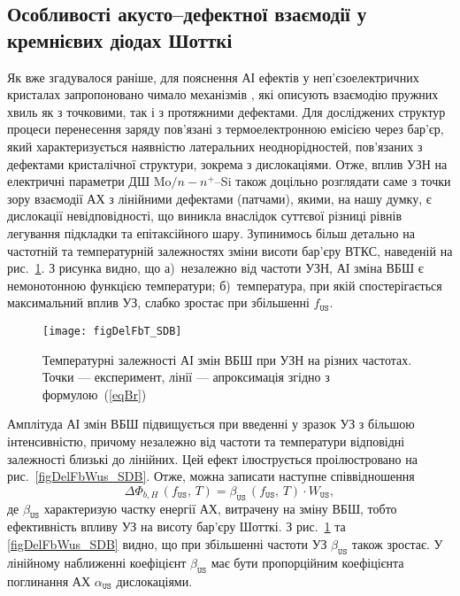 \subsection{Особливості акусто--дефектної взаємодії у кремнієвих діодах Шотткі}

Як вже згадувалося раніше, для пояснення АІ ефектів у неп'єзоелектричних кристалах
запропоновано чимало механізмів \cite{Pavlovich,Korotchenkov1995,MirzadeJAP2011,PELESHCHAK:UPJ2016,Krevchik,MirzadeJAP2005,Davletova2008,OstrovKor92},
які описують взаємодію пружних хвиль як з точковими, так і з протяжними дефектами.
Для досліджених структур процеси перенесення заряду пов'язані з термоелектронною емісією
через бар'єр, який характеризується наявністю латеральних неоднорідностей, пов'язаних з дефектами
кристалічної структури, зокрема з дислокаціями.
Отже, вплив УЗН на електричні параметри ДШ Mo$/n-n^+$--Si також доцільно розглядати саме з точки зору
взаємодії АХ з лінійними дефектами (патчами), якими, на нашу думку, є дислокації невідповідності, що
виникла внаслідок суттєвої різниці рівнів легування підкладки та епітаксійного шару.
Зупинимось більш детально на частотній та температурній залежностях зміни висоти бар'єру ВТКС,
наведеній на рис.~\ref{figDelFbT_SDB}.
З рисунка видно, що
а)~незалежно від частоти УЗН, АІ зміна ВБШ є немонотонною функцією температури;
б)~температура, при якій спостерігається максимальний вплив УЗ, слабко зростає при збільшенні $f_\mathtt{US}$.

\begin{figure}
\center
\texttt{[image: figDelFbT\_SDB]}
\caption{\label{figDelFbT_SDB}
Температурні залежності АІ змін ВБШ при УЗН на різних частотах.
Точки --- експеримент,
лінії --- апроксимація згідно з формулою~(\ref{eqBr})
}%
\end{figure}

Амплітуда АІ змін ВБШ підвищується при введенні у зразок УЗ з більшою інтенсивністю, причому незалежно від частоти та температури
відповідні залежності близькі до лінійних.
Цей ефект ілюструється проілюстровано на рис.~\ref{figDelFbWus_SDB}.
Отже, можна записати наступне співвідношення
\begin{equation}
\label{eqBt}
\Delta\Phi_{b,H}\,(f_\mathtt{US},\,T)=\beta_\mathtt{US}\,(f_\mathtt{US},\,T)\cdot W_\mathtt{US},
\end{equation}
де
$\beta_\mathtt{US}$ характеризую частку енергії АХ, витрачену на зміну ВБШ, тобто
ефективність впливу УЗ на висоту бар'єру Шотткі.
З рис.~\ref{figDelFbT_SDB} та \ref{figDelFbWus_SDB} видно, що при збільшенні частоти УЗ $\beta_\mathtt{US}$ також зростає.
У лінійному наближенні коефіцієнт $\beta_\mathtt{US}$ має бути пропорційним коефіцієнта поглинання АХ $\alpha_\mathtt{US}$ дислокаціями.

